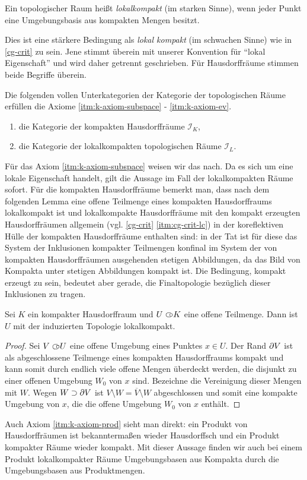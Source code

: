 \begin{defn}
  Ein topologischer Raum heißt \emph{lokalkompakt} (im starken Sinne),
  wenn jeder Punkt eine Umgebungsbasis aus kompakten Mengen besitzt.
\end{defn}
\begin{bem}
  Dies ist eine stärkere Bedingung als \emph{lokal kompakt} (im
  schwachen Sinne) wie in \ref{cg-crit} zu sein. Jene stimmt überein
  mit unserer Konvention für ``lokal Eigenschaft'' und wird daher
  getrennt geschrieben. Für Hausdorffräume stimmen beide Begriffe
  überein.
\end{bem}
\begin{prop}
  Die folgenden vollen Unterkategorien der Kategorie der topologischen
  Räume erfüllen die Axiome \ref{itm:k-axiom-subspace} -
  \ref{itm:k-axiom-ev}.
  \begin{enumerate}[label=(\roman*)]
  \item die Kategorie der kompakten Hausdorffräume $\mathcal{I}_K$,
  \item die Kategorie der lokalkompakten topologischen Räume
    $\mathcal{I}_L$.
  \end{enumerate}
\end{prop}
Für das Axiom \ref{itm:k-axiom-subspace} weisen wir das nach. Da es
sich um eine lokale Eigenschaft handelt, gilt die Aussage im Fall der
lokalkompakten Räume sofort. Für die kompakten Hausdorffräume bemerkt
man, dass nach dem folgenden Lemma eine offene Teilmenge eines
kompakten Hausdorffraums lokalkompakt ist und lokalkompakte
Hausdorffräume mit den kompakt erzeugten Hausdorffräumen allgemein
(vgl. \ref{cg-crit} \ref{itm:cg-crit-lc}) in der koreflektiven Hülle
der kompakten Hausdorffräume enthalten sind: in der Tat ist für diese
das System der Inklusionen kompakter Teilmengen konfinal im System der
von kompakten Hausdorffräumen ausgehenden stetigen Abbildungen, da das
Bild von Kompakta unter stetigen Abbildungen kompakt ist. Die
Bedingung, kompakt erzeugt zu sein, bedeutet aber gerade, die
Finaltopologie bezüglich dieser Inklusionen zu tragen.
\begin{lemma}
  Sei $K$ ein kompakter Hausdorffraum und $U \subset\kern-0.58em\circ K$ eine offene
  Teilmenge. Dann ist $U$ mit der induzierten Topologie lokalkompakt.
\end{lemma}
\begin{proof}
  Sei $V \subset\kern-0.58em\circ U$ eine offene Umgebung eines Punktes $x \in U$. Der
  Rand $\partial V$ ist als abgeschlossene Teilmenge eines kompakten
  Hausdorffraums kompakt und kann somit durch endlich viele offene
  Mengen überdeckt werden, die disjunkt zu einer offenen Umgebung
  $W_0$ von $x$ sind. Bezeichne die Vereinigung dieser Mengen mit
  $W$. Wegen $W \supset \partial V$ ist $V \setminus W = \overline{V}
  \setminus W$ abgeschlossen und somit eine kompakte Umgebung von $x$,
  die die offene Umgebung $W_0$ von $x$ enthält.
\end{proof}
Auch Axiom \ref{itm:k-axiom-prod} sieht man direkt: ein Produkt von
Hausdorffräumen ist bekanntermaßen wieder Hausdorffsch und ein Produkt
kompakter Räume wieder kompakt. Mit dieser Aussage finden wir auch bei
einem Produkt lokalkompakter Räume Umgebungsbasen aus Kompakta durch
die Umgebungsbasen aus Produktmengen.

